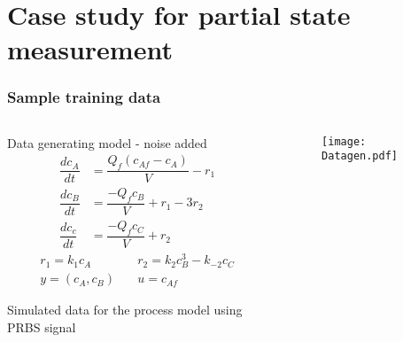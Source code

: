 \documentclass[dvipsnames, 9pt]{beamer}
\begin{document}
\section{Case study for partial state measurement}
\begin{frame}
    \frametitle{Sample training data}
    
    \begin{columns}
    {   \begin{column}{0.37\textwidth}
        \begin{block}{Data generating model - noise added}
\begin{align*}
\dfrac{dc_A}{dt} &= \dfrac{Q_f (c_{Af} - c_A)}{V} - r_1 \\
\dfrac{dc_B}{dt} &= \dfrac{-Q_f c_B}{V} + r_1 - 3r_2 \\
\dfrac{dc_c}{dt} &= \dfrac{-Q_f c_C}{V} + r_2 
\end{align*}
\begin{align*}
r_1 = k_1 c_A &\quad r_2 = k_2 c_B^3 - k_{-2} c_C \\
y = (c_A, c_B) &\quad u = c_{Af}
\end{align*}
\end{block}
Simulated data for the process model using PRBS signal
        \end{column}}
        \begin{column}{0.63\textwidth}
            \begin{figure}
\texttt{[image: Datagen.pdf]}
 \end{figure}
        \end{column}
    \end{columns}
\end{frame}
\end{document}
